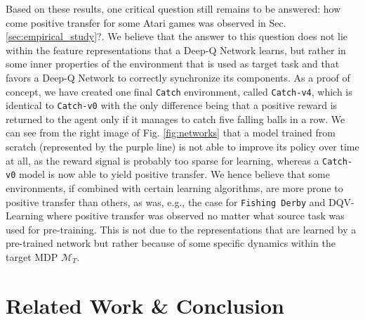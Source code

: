 Based on these results, one critical question still remains to be answered: how come positive transfer for some Atari games was observed in Sec. \ref{sec:empirical_study}?. We believe that the answer to this question does not lie within the feature representations that a Deep-Q Network learns, but rather in some inner properties of the environment that is used as target task and that favors a Deep-Q Network to correctly synchronize its components. As a proof of concept, we have created one final \texttt{Catch} environment, called \texttt{Catch-v4}, which is identical to \texttt{Catch-v0} with the only difference being that a positive reward is returned to the agent only if it manages to catch five falling balls in a row. We can see from the right image of Fig. \ref{fig:networks} that a model trained from scratch (represented by the purple line) is not able to improve its policy over time at all, as the reward signal is probably too sparse for learning, whereas a \texttt{Catch-v0} model is now able to yield positive transfer. We hence believe that some environments, if combined with certain learning algorithms, are more prone to positive transfer than others, as was, e.g., the case for \texttt{Fishing Derby} and DQV-Learning where positive transfer was observed no matter what source task was used for pre-training. This is not due to the representations that are learned by a pre-trained network but rather because of some specific dynamics within the target MDP $\mathcal{M}_T$. 




\section{Related Work \& Conclusion}
\label{sec:related_work_and_conclusion}

